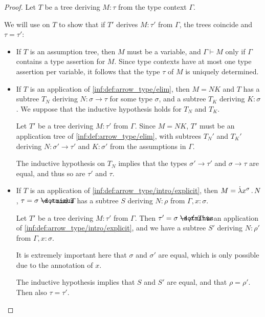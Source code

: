 \begin{proof}
  Let \( T \) be a tree deriving \( M: \tau \) from the type context \( \Gamma \).

  We will use  on \( T \) to show that if \( T' \) derives \( M: \tau' \) from \( \Gamma \), the trees coincide and \( \tau = \tau' \):
  \begin{itemize}
    \item If \( T \) is an assumption tree, then \( M \) must be a variable, and \( \Gamma \vdash M \) only if \( \Gamma \) contains a type assertion for \( M \). Since type contexts have at most one type assertion per variable, it follows that the type \( \tau \) of \( M \) is uniquely determined.

    \item If \( T \) is an application of \ref{inf:def:arrow_type/elim}, then \( M = NK \) and \( T \) has a subtree \( T_N \) deriving \( N: \sigma \to \tau \) for some type \( \sigma \), and a subtree \( T_K \) deriving \( K: \sigma \). We suppose that the inductive hypothesis holds for \( T_N \) and \( T_K \).

    Let \( T' \) be a tree deriving \( M: \tau' \) from \( \Gamma \). Since \( M = NK \), \( T' \) must be an application tree of \ref{inf:def:arrow_type/elim}, with subtrees \( T_N' \) and \( T_K' \) deriving \( N: \sigma' \to \tau' \) and \( K: \sigma' \) from the assumptions in \( \Gamma \).

    The inductive hypothesis on \( T_N \) implies that the types \( \sigma' \to \tau' \) and \( \sigma \to \tau \) are equal, and thus so are \( \tau' \) and \( \tau \).

    \item If \( T \) is an application of \ref{inf:def:arrow_type/intro/explicit}, then \( M = \qabs {x^\sigma} N \), \( \tau = \sigma \synimplies \rho \) and \( T \) has a subtree \( S \) deriving \( N: \rho \) from \( \Gamma, x: \sigma \).

    Let \( T' \) be a tree deriving \( M: \tau' \) from \( \Gamma \). Then \( \tau' = \sigma \synimplies \rho' \) \( T' \) is an application of \ref{inf:def:arrow_type/intro/explicit}, and we have a subtree \( S' \) deriving \( N: \rho' \) from \( \Gamma, x: \sigma \).

    It is extremely important here that \( \sigma \) and \( \sigma' \) are equal, which is only possible due to the annotation of \( x \).

    The inductive hypothesis implies that \( S \) and \( S' \) are equal, and that \( \rho = \rho' \). Then also \( \tau = \tau' \).
  \end{itemize}
\end{proof}

